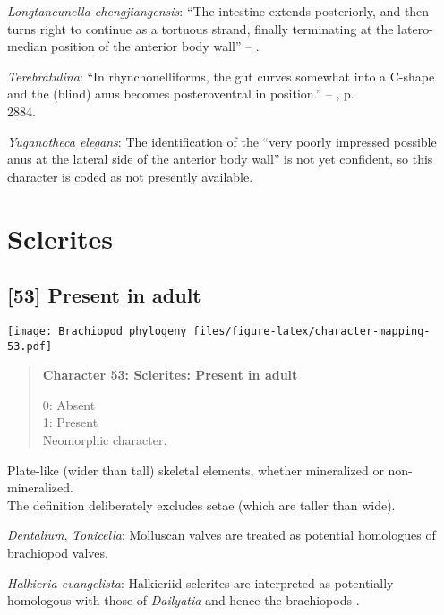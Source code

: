 \documentclass[openany]{book}
\theoremstyle{definition}
\theoremstyle{definition}
\theoremstyle{definition}
\theoremstyle{remark}
\begin{document}
\hypertarget{Longtancunella_chengjiangensis-coding-52}{}
\emph{Longtancunella chengjiangensis}: ``The intestine extends
posteriorly, and then turns right to continue as a tortuous strand,
finally terminating at the latero-median position of the anterior body
wall'' -- \citet{Zhang2007Agregarious}.

\hypertarget{Terebratulina-coding-52}{}
\emph{Terebratulina}: ``In rhynchonelliforms, the gut curves somewhat
into a C-shape and the (blind) anus becomes posteroventral in
position.'' -- \citet{Williams2007Supplement}, p.\\
2884.

\hypertarget{Yuganotheca_elegans-coding-52}{}
\emph{Yuganotheca elegans}: The identification of the ``very poorly
impressed possible anus at the lateral side of the anterior body wall''
is not yet confident, so this character is coded as not presently
available.

\section{Sclerites}\label{sclerites}

\subsection*{{[}53{]} Present in adult}\label{present-in-adult}

\texttt{[image: Brachiopod\_phylogeny\_files/figure-latex/character-mapping-53.pdf]}

\begin{quote}
\textbf{Character 53: Sclerites: Present in adult}

0: Absent\\
1: Present\\
Neomorphic character.
\end{quote}

Plate-like (wider than tall) skeletal elements, whether mineralized or
non-mineralized.\\
The definition deliberately excludes setae (which are taller than wide).

\hypertarget{Dentalium-coding-53}{}
\emph{Dentalium}, \emph{Tonicella}: Molluscan valves are treated as
potential homologues of brachiopod valves.

\hypertarget{Halkieria_evangelista-coding-53}{}
\emph{Halkieria evangelista}: Halkieriid sclerites are interpreted as
potentially homologous with those of \emph{Dailyatia} and hence the
brachiopods \citep{Zhao2017}.
\end{document}

